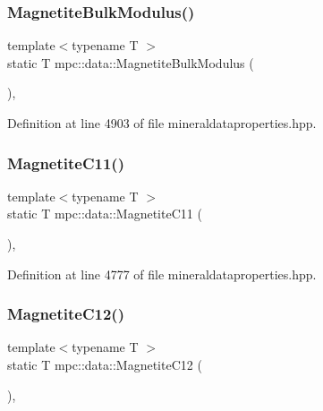 \subsubsection{\texorpdfstring{Magnetite\+Bulk\+Modulus()}{MagnetiteBulkModulus()}}
{\footnotesize\ttfamily template$<$typename T $>$ \\
static T mpc\+::data\+::\+Magnetite\+Bulk\+Modulus (\begin{DoxyParamCaption}{ }\end{DoxyParamCaption})\hspace{0.3cm}{\ttfamily [inline]}, {\ttfamily [static]}}



Definition at line 4903 of file mineraldataproperties.\+hpp.

\mbox{\label{namespacempc_1_1data_a752554da3cc5c37240682acd2fa74cbc}} 
\subsubsection{\texorpdfstring{Magnetite\+C11()}{MagnetiteC11()}}
{\footnotesize\ttfamily template$<$typename T $>$ \\
static T mpc\+::data\+::\+Magnetite\+C11 (\begin{DoxyParamCaption}{ }\end{DoxyParamCaption})\hspace{0.3cm}{\ttfamily [inline]}, {\ttfamily [static]}}



Definition at line 4777 of file mineraldataproperties.\+hpp.

\mbox{\label{namespacempc_1_1data_ad586835141915eaaf8b4627e999d065b}} 
\subsubsection{\texorpdfstring{Magnetite\+C12()}{MagnetiteC12()}}
{\footnotesize\ttfamily template$<$typename T $>$ \\
static T mpc\+::data\+::\+Magnetite\+C12 (\begin{DoxyParamCaption}{ }\end{DoxyParamCaption})\hspace{0.3cm}{\ttfamily [inline]}, {\ttfamily [static]}}



